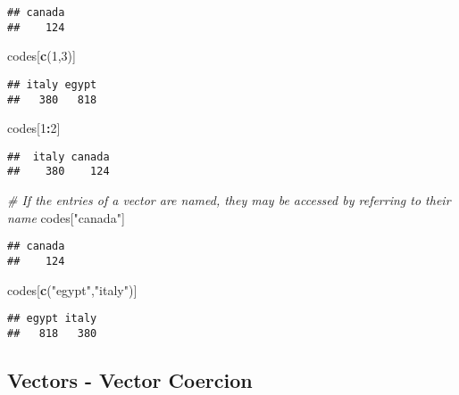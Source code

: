 \documentclass[]{article}
\newenvironment{Shaded}{\begin{snugshade}}{\end{snugshade}}
\newcommand{\CommentTok}[1]{\textcolor[rgb]{0.56,0.35,0.01}{\textit{#1}}}
\newcommand{\DecValTok}[1]{\textcolor[rgb]{0.00,0.00,0.81}{#1}}
\newcommand{\KeywordTok}[1]{\textcolor[rgb]{0.13,0.29,0.53}{\textbf{#1}}}
\newcommand{\NormalTok}[1]{#1}
\newcommand{\OperatorTok}[1]{\textcolor[rgb]{0.81,0.36,0.00}{\textbf{#1}}}
\newcommand{\StringTok}[1]{\textcolor[rgb]{0.31,0.60,0.02}{#1}}
\begin{document}
\begin{verbatim}
## canada 
##    124
\end{verbatim}

\begin{Shaded}
\begin{Highlighting}[]
\NormalTok{codes[}\KeywordTok{c}\NormalTok{(}\DecValTok{1}\NormalTok{,}\DecValTok{3}\NormalTok{)]}
\end{Highlighting}
\end{Shaded}

\begin{verbatim}
## italy egypt 
##   380   818
\end{verbatim}

\begin{Shaded}
\begin{Highlighting}[]
\NormalTok{codes[}\DecValTok{1}\OperatorTok{:}\DecValTok{2}\NormalTok{]}
\end{Highlighting}
\end{Shaded}

\begin{verbatim}
##  italy canada 
##    380    124
\end{verbatim}

\begin{Shaded}
\begin{Highlighting}[]
\CommentTok{# If the entries of a vector are named, they may be accessed by referring to their name}
\NormalTok{codes[}\StringTok{"canada"}\NormalTok{]}
\end{Highlighting}
\end{Shaded}

\begin{verbatim}
## canada 
##    124
\end{verbatim}

\begin{Shaded}
\begin{Highlighting}[]
\NormalTok{codes[}\KeywordTok{c}\NormalTok{(}\StringTok{"egypt"}\NormalTok{,}\StringTok{"italy"}\NormalTok{)]}
\end{Highlighting}
\end{Shaded}

\begin{verbatim}
## egypt italy 
##   818   380
\end{verbatim}

\hypertarget{vectors---vector-coercion}{%
\subsection{Vectors - Vector Coercion}\label{vectors---vector-coercion}}
\end{document}
